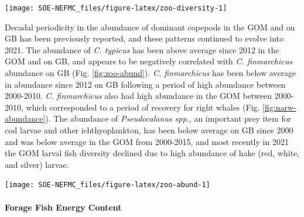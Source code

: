 \documentclass[
  10pt,
]{article}
\let\origfigure\figure
\let\endorigfigure\endfigure
\renewenvironment{figure}[1][2] {
    \expandafter\origfigure\expandafter[H]
} {
    \endorigfigure
}
\begin{document}
\begin{figure}

{\centering \texttt{[image: SOE-NEFMC\_files/figure-latex/zoo-diversity-1]} 

}

\caption{Zooplankton community diversity for Georges Bank (GB) and the Gulf of Maine (GOM).}\label{fig:zoo-diversity}
\end{figure}

Decadal periodicity in the abundance of dominant copepods in the GOM and on GB has been previously reported, and these patterns continued to evolve into 2021. The abundance of \emph{C. typicus} has been above average since 2012 in the GOM and on GB, and appears to be negatively correlated with \emph{C. finmarchicus} abundance on GB (Fig. \ref{fig:zoo-abund}). \emph{C. finmarchicus} has been below average in abundance since 2012 on GB following a period of high abundance between 2000-2010. \emph{C. finmarchicus} also had high abundance in the GOM between 2000-2010, which corresponded to a period of recovery for right whales (Fig. \ref{fig:narw-abundance}). The abundance of \emph{Pseudocalanus spp.}, an important prey item for cod larvae and other ichthyoplankton, has been below average on GB since 2000 and was below average in the GOM from 2000-2015, and most recently in 2021 the GOM larval fish diversity declined due to high abundance of hake (red, white, and silver) larvae.

\begin{figure}

{\centering \texttt{[image: SOE-NEFMC\_files/figure-latex/zoo-abund-1]} 

}

\caption{Abundance Annomalies of three dominante zooplankton (\textit{Calanus finmarchicus}, \textit{Calanus typicus}, and \textit{Pseudocalanus spp}.) on Georges Bank (GB) and the Gulf of Maine (GOM).}\label{fig:zoo-abund}
\end{figure}

\hypertarget{forage-fish-energy-content}{%
\paragraph{Forage Fish Energy Content}\label{forage-fish-energy-content}}
\end{document}
